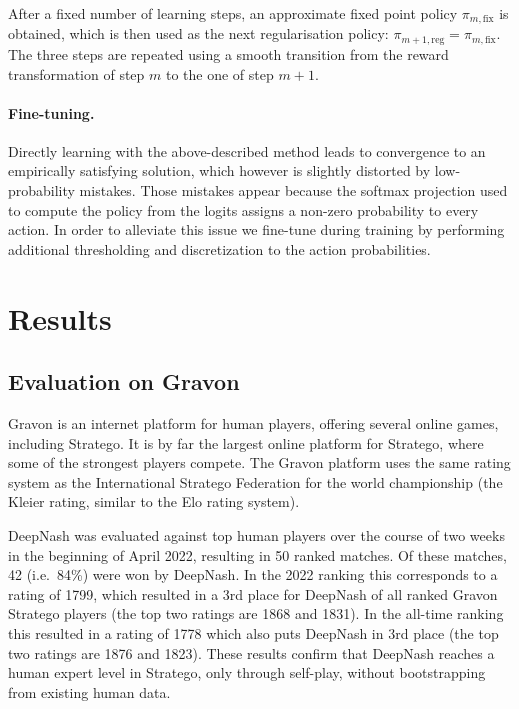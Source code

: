 After a fixed number of learning steps, an approximate fixed point policy $\pi_{m,\textrm{fix}}$ is obtained, which is then used as the next regularisation policy: $\pi_{m+1,\textrm{reg}}=\pi_{m,\textrm{fix}}$. The three steps are repeated using a smooth transition from the reward transformation of step $m$ to the one of step $m+1$.

\paragraph{Fine-tuning.}
Directly learning with the above-described method leads to convergence to an empirically satisfying solution, which however is slightly distorted by low-probability mistakes. Those mistakes appear because the softmax projection used to compute the policy from the logits assigns a non-zero probability to every action. In order to alleviate this issue we fine-tune during training by performing additional thresholding and discretization to the action probabilities.

\section{Results}

\subsection{Evaluation on Gravon}
Gravon is an internet platform for human players, offering several online games, including Stratego. It is by far the largest online platform for Stratego, where some of the strongest players compete. The Gravon platform uses the same rating system as the International Stratego Federation for the world championship (the Kleier rating, similar to the Elo rating system).

DeepNash was evaluated against top human players over the course of two weeks in the beginning of April 2022, resulting in 50 ranked matches. Of these matches, 42 (i.e.\ 84\%) were won by DeepNash. In the 2022 ranking this corresponds to a rating of 1799, which resulted in a 3rd place for DeepNash of all ranked Gravon Stratego players (the top two ratings are 1868 and 1831). In the all-time ranking this resulted in a rating of 1778 which also puts DeepNash in 3rd place (the top two ratings are 1876 and 1823). These results confirm that DeepNash reaches a human expert level in Stratego, only through self-play, without bootstrapping from existing human data.


